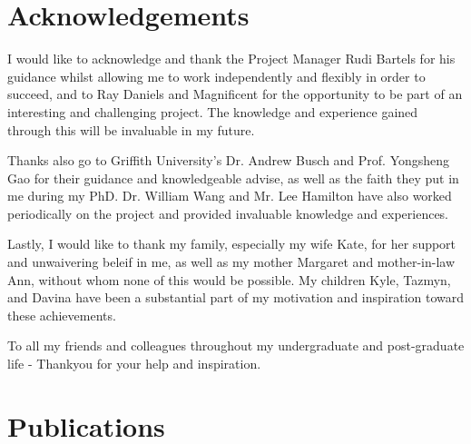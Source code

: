 \documentclass[fleqn,twoside,12pt]{report}
\begin{document}


\newpage

\chapter*{Acknowledgements}


I would like to acknowledge and thank the Project Manager Rudi Bartels for his guidance whilst allowing me to work independently and flexibly in order to succeed, and to Ray Daniels and Magnificent for the opportunity to be part of an interesting and challenging project. The knowledge and experience gained through this will be invaluable in my future.

Thanks also go to Griffith University's Dr. Andrew Busch and Prof. Yongsheng Gao for their guidance and knowledgeable advise, as well as the faith they put in me during my PhD. Dr. William Wang and Mr. Lee Hamilton have also worked periodically on the project and provided invaluable knowledge and experiences.

Lastly, I would like to thank my family, especially my wife Kate, for her support and unwaivering beleif in me, as well as my mother Margaret and mother-in-law Ann, without whom none of this would be possible. My children Kyle, Tazmyn, and Davina have been a substantial part of my motivation and inspiration toward these achievements.

To all my friends and colleagues throughout my undergraduate and post-graduate life - Thankyou for your help and inspiration.

\vspace*{\fill}%



\newpage

\chapter*{Publications}
\end{document}
